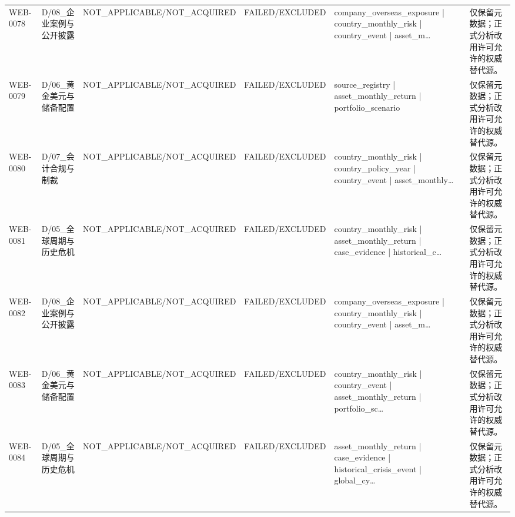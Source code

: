 \begin{landscape}
\begin{longtable}{p{1.8cm}p{2.6cm}p{2.6cm}p{2.6cm}p{4.8cm}p{7.2cm}}
WEB-0078 & D/\allowbreak{}08\_\allowbreak{}企业案例与公开披露 & NOT\_\allowbreak{}APPLICABLE/\allowbreak{}NOT\_\allowbreak{}ACQUIRED & FAILED/\allowbreak{}EXCLUDED & company\_\allowbreak{}overseas\_\allowbreak{}exposure | country\_\allowbreak{}monthly\_\allowbreak{}risk | country\_\allowbreak{}event | asset\_\allowbreak{}m… & 仅保留元数据；正式分析改用许可允许的权威替代源。\\
WEB-0079 & D/\allowbreak{}06\_\allowbreak{}黄金美元与储备配置 & NOT\_\allowbreak{}APPLICABLE/\allowbreak{}NOT\_\allowbreak{}ACQUIRED & FAILED/\allowbreak{}EXCLUDED & source\_\allowbreak{}registry | asset\_\allowbreak{}monthly\_\allowbreak{}return | portfolio\_\allowbreak{}scenario & 仅保留元数据；正式分析改用许可允许的权威替代源。\\
WEB-0080 & D/\allowbreak{}07\_\allowbreak{}会计合规与制裁 & NOT\_\allowbreak{}APPLICABLE/\allowbreak{}NOT\_\allowbreak{}ACQUIRED & FAILED/\allowbreak{}EXCLUDED & country\_\allowbreak{}monthly\_\allowbreak{}risk | country\_\allowbreak{}policy\_\allowbreak{}year | country\_\allowbreak{}event | asset\_\allowbreak{}monthly… & 仅保留元数据；正式分析改用许可允许的权威替代源。\\
WEB-0081 & D/\allowbreak{}05\_\allowbreak{}全球周期与历史危机 & NOT\_\allowbreak{}APPLICABLE/\allowbreak{}NOT\_\allowbreak{}ACQUIRED & FAILED/\allowbreak{}EXCLUDED & country\_\allowbreak{}monthly\_\allowbreak{}risk | asset\_\allowbreak{}monthly\_\allowbreak{}return | case\_\allowbreak{}evidence | historical\_\allowbreak{}c… & 仅保留元数据；正式分析改用许可允许的权威替代源。\\
WEB-0082 & D/\allowbreak{}08\_\allowbreak{}企业案例与公开披露 & NOT\_\allowbreak{}APPLICABLE/\allowbreak{}NOT\_\allowbreak{}ACQUIRED & FAILED/\allowbreak{}EXCLUDED & company\_\allowbreak{}overseas\_\allowbreak{}exposure | country\_\allowbreak{}monthly\_\allowbreak{}risk | country\_\allowbreak{}event | asset\_\allowbreak{}m… & 仅保留元数据；正式分析改用许可允许的权威替代源。\\
WEB-0083 & D/\allowbreak{}06\_\allowbreak{}黄金美元与储备配置 & NOT\_\allowbreak{}APPLICABLE/\allowbreak{}NOT\_\allowbreak{}ACQUIRED & FAILED/\allowbreak{}EXCLUDED & country\_\allowbreak{}monthly\_\allowbreak{}risk | country\_\allowbreak{}event | asset\_\allowbreak{}monthly\_\allowbreak{}return | portfolio\_\allowbreak{}sc… & 仅保留元数据；正式分析改用许可允许的权威替代源。\\
WEB-0084 & D/\allowbreak{}05\_\allowbreak{}全球周期与历史危机 & NOT\_\allowbreak{}APPLICABLE/\allowbreak{}NOT\_\allowbreak{}ACQUIRED & FAILED/\allowbreak{}EXCLUDED & asset\_\allowbreak{}monthly\_\allowbreak{}return | case\_\allowbreak{}evidence | historical\_\allowbreak{}crisis\_\allowbreak{}event | global\_\allowbreak{}cy… & 仅保留元数据；正式分析改用许可允许的权威替代源。\\

\end{longtable}
\end{landscape}
